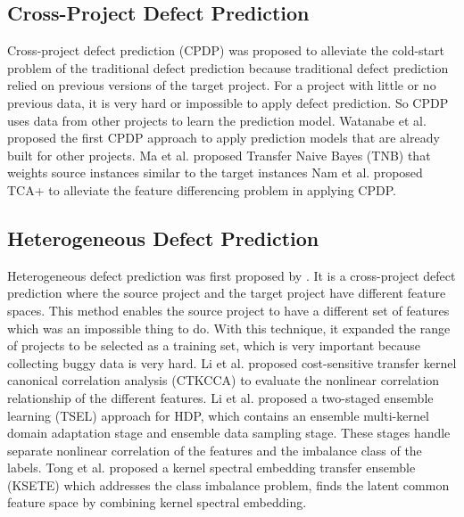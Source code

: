 \subsection{Cross-Project Defect Prediction}
Cross-project defect prediction (CPDP) was proposed to alleviate the cold-start problem of the traditional defect prediction because traditional defect prediction relied on previous versions of the target project.
For a project with little or no previous data, it is very hard or impossible to apply defect prediction.
So CPDP uses data from other projects to learn the prediction model.
Watanabe et al. \cite{watanabe2008adapting} proposed the first CPDP approach to apply prediction models that are already built for other projects.
Ma et al. \cite{ma2012transfer} proposed Transfer Naive Bayes (TNB) that weights source instances similar to the target instances
Nam et al. \cite{nam2013transfer} proposed TCA+ to alleviate the feature differencing problem in applying CPDP.

\subsection{Heterogeneous Defect Prediction}
Heterogeneous defect prediction was first proposed by \cite{nam2017heterogeneous}. It is a cross-project defect prediction where the source project and the target project have different feature spaces.
This method enables the source project to have a different set of features which was an impossible thing to do.
With this technique, it expanded the range of projects to be selected as a training set, which is very important because collecting buggy data is very hard.
Li et al. \cite{li2018cost} proposed cost-sensitive transfer kernel canonical correlation analysis (CTKCCA) to evaluate the nonlinear correlation relationship of the different features.
Li et al. \cite{li2019heterogeneous} proposed a two-staged ensemble learning (TSEL) approach for HDP, which contains an ensemble multi-kernel domain adaptation stage and ensemble data sampling stage. These stages handle separate nonlinear correlation of the features and the imbalance class of the labels.
Tong et al. \cite{tong2019kernel} proposed a kernel spectral embedding transfer ensemble (KSETE) which addresses the class imbalance problem, finds the latent common feature space by combining kernel spectral embedding.


